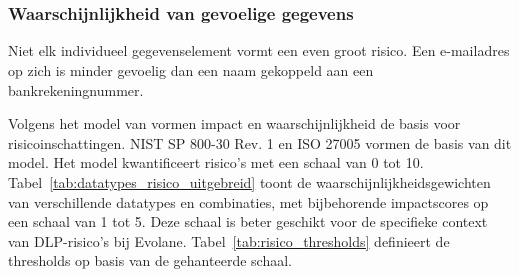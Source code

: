 

\section{}
\label{sec:data_risico}

\subsubsection{Waarschijnlijkheid van gevoelige gegevens}
Niet elk individueel gegevenselement vormt een even groot risico. Een e-mailadres op zich is minder gevoelig dan een naam gekoppeld aan een bankrekeningnummer. 


Volgens het model van \textcite{AlFikri2019} vormen impact en waarschijnlijkheid de basis voor risico\-inschattingen. 
NIST SP 800-30 Rev. 1 \autocite{NIST800-30} en ISO 27005 \autocite{IOSIEC2022} vormen de basis van dit model.
Het model kwantificeert risico's met een schaal van 0 tot 10. 
Tabel~\ref{tab:datatypes_risico_uitgebreid} toont de waarschijnlijkheidsgewichten van verschillende datatypes en combinaties, 
met bijbehorende impactscores op een schaal van 1 tot 5.
Deze schaal is beter geschikt voor de specifieke context van DLP-risico's bij Evolane.
Tabel~\ref{tab:risico_thresholds} definieert de thresholds op basis van de gehanteerde schaal.

